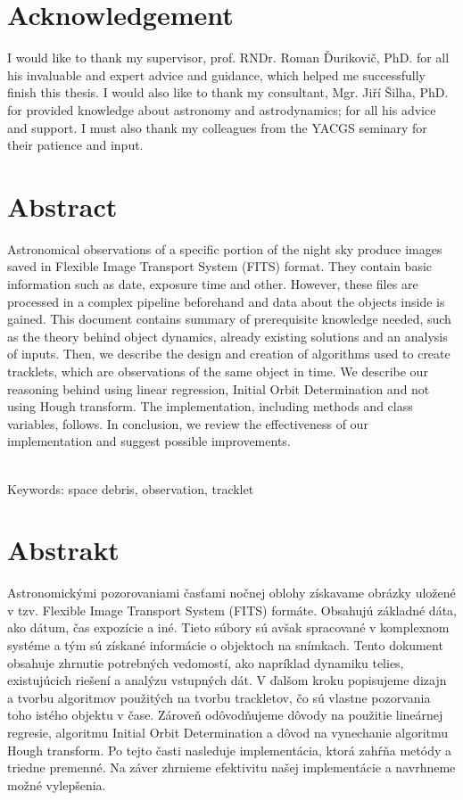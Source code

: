 \documentclass[12pt, a4paper, oneside]{book}
\begin{document}
\chapter*{Acknowledgement}\label{chap:thank_you}
I would like to thank my supervisor, prof. RNDr. Roman Ďurikovič, PhD. for all his invaluable and expert advice and guidance, which helped me successfully finish this thesis. I would also like to thank my consultant, Mgr. Jiří Šilha, PhD. for provided knowledge about astronomy and astrodynamics; for all his advice and support. I must also thank my colleagues from the YACGS seminary for their patience and input.
\vfill\eject 

\chapter*{Abstract}\label{chap:abstract_en}
Astronomical observations of a specific portion of the night sky produce images saved in Flexible Image Transport System (FITS) format. They contain basic information such as date, exposure time and other. However, these files are processed in a complex pipeline beforehand and data about the objects inside is gained. This document contains summary of prerequisite knowledge needed, such as the theory behind object dynamics, already existing solutions and an analysis of inputs. Then, we describe the design and creation of algorithms used to create tracklets, which are observations of the same object in time. We describe our reasoning behind using linear regression, Initial Orbit Determination and not using Hough transform. The implementation, including methods and class variables, follows. In conclusion, we review the effectiveness of our implementation and suggest possible improvements.

~\\
Keywords: space debris, observation, tracklet
\vfill\eject 

\chapter*{Abstrakt}\label{chap:abstract_sk}
Astronomickými pozorovaniami časťami nočnej oblohy získavame obrázky uložené v tzv. Flexible Image Transport System (FITS) formáte. Obsahujú základné dáta, ako dátum, čas expozície a iné. Tieto súbory sú avšak spracované v komplexnom systéme a tým sú získané informácie o objektoch na snímkach. Tento dokument obsahuje zhrnutie potrebných vedomostí, ako napríklad dynamiku telies, existujúcich riešení a analýzu vstupných dát. V ďalšom kroku popisujeme dizajn a tvorbu algoritmov použitých na tvorbu trackletov, čo sú vlastne pozorvania toho istého objektu v čase. Zároveň odôvodňujeme dôvody na použitie lineárnej regresie, algoritmu Initial Orbit Determination a dôvod na vynechanie algoritmu Hough transform. Po tejto časti nasleduje implementácia, ktorá zahŕňa metódy a triedne premenné. Na záver zhrnieme efektivitu našej implementácie a navrhneme možné vylepšenia.
\end{document}

